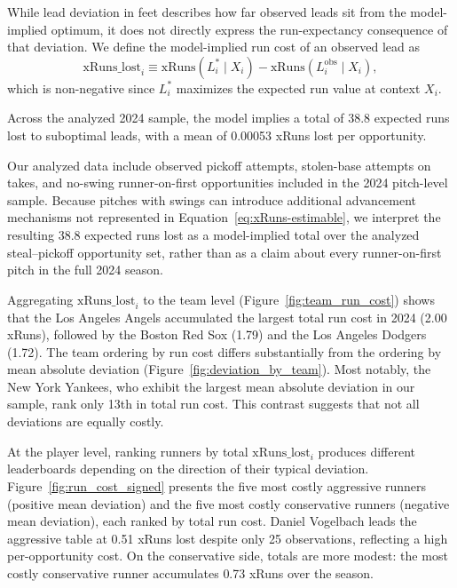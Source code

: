 \documentclass[12pt,letterpaper]{article}
\begin{document}
While lead deviation in feet describes how far observed leads sit from the model-implied optimum, it does not directly express the run-expectancy consequence of that deviation. We define the model-implied run cost of an observed lead as
\begin{equation}
    \mathrm{xRuns\_lost}_i \equiv \mathrm{xRuns}(L_i^* \mid X_i) - \mathrm{xRuns}(L_i^{\mathrm{obs}} \mid X_i), \label{eq:xruns-lost}
\end{equation}
which is non-negative since $L_i^*$ maximizes the expected run value at context $X_i$.

Across the analyzed 2024 sample, the model implies a total of 38.8 expected runs lost to suboptimal leads, with a mean of 0.00053 xRuns lost per opportunity.

Our analyzed data include observed pickoff attempts, stolen-base attempts on takes, and no-swing runner-on-first opportunities included in the 2024 pitch-level sample. Because pitches with swings can introduce additional advancement mechanisms not represented in Equation~\ref{eq:xRuns-estimable}, we interpret the resulting 38.8 expected runs lost as a model-implied total over the analyzed steal--pickoff opportunity set, rather than as a claim about every runner-on-first pitch in the full 2024 season.

Aggregating $\mathrm{xRuns\_lost}_i$ to the team level (Figure~\ref{fig:team_run_cost}) shows that the Los Angeles Angels accumulated the largest total run cost in 2024 (2.00 xRuns), followed by the Boston Red Sox (1.79) and the Los Angeles Dodgers (1.72). The team ordering by run cost differs substantially from the ordering by mean absolute deviation (Figure~\ref{fig:deviation_by_team}). Most notably, the New York Yankees, who exhibit the largest mean absolute deviation in our sample, rank only 13th in total run cost. This contrast suggests that not all deviations are equally costly.

At the player level, ranking runners by total $\mathrm{xRuns\_lost}_i$ produces different leaderboards depending on the direction of their typical deviation. Figure~\ref{fig:run_cost_signed} presents the five most costly aggressive runners (positive mean deviation) and the five most costly conservative runners (negative mean deviation), each ranked by total run cost. Daniel Vogelbach leads the aggressive table at 0.51 xRuns lost despite only 25 observations, reflecting a high per-opportunity cost. On the conservative side, totals are more modest: the most costly conservative runner accumulates 0.73 xRuns over the season.
\end{document}
